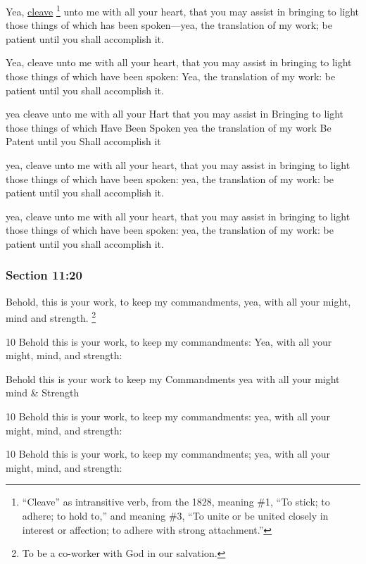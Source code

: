 		Yea, \hyperref[CLEAVE]{cleave}%
			\footnote{%
				``Cleave'' as intransitive verb, from the 1828, meaning \#1, ``To stick; to adhere; to hold to,'' and meaning \#3, ``To unite or be united closely in interest or affection; to adhere with strong attachment.''
				}
		unto me with all your heart, that you may assist in bringing to light those things of which has been spoken---yea, the translation of my work; be patient until you shall accomplish it.

		\begin{framed}
		\scriptsize
			\begin{compactdesc}
				\item[JSP] Yea, cleave unto me with all your heart, that you may assist in bringing to light those things of which have been spoken: Yea, the translation of my work: be patient until you shall accomplish it.
				\item[HS] yea cleave unto me with all your Hart that you may assist in Bringing to light those things of which Have Been Spoken yea the translation of my work Be Patent until you Shall accomplish it 
				\item[DC 1835] yea, cleave unto me with all your heart, that you may assist in bringing to light those things of which have been spoken: yea, the translation of my work: be patient until you shall accomplish it.
				\item[DC 1844] yea, cleave unto me with all your heart, that you may assist in bringing to light those things of which have been spoken: yea, the translation of my work: be patient until you shall accomplish it.
			\end{compactdesc}
		\end{framed}

	\subsubsection{Section 11:20} %
		\label{DC11-20}

		Behold, this is your work, to keep my commandments, yea, with all your might, mind and strength.%
			\footnote{%
				To be a co-worker with God in our salvation.
				}

		\begin{framed}
		\scriptsize
			\begin{compactdesc}
				\item[JSP] 10 Behold this is your work, to keep my commandments: Yea, with all your might, mind, and strength:
				\item[HS] Behold this is your work to keep my Commandments yea with all your might mind \& Strength 
				\item[DC 1835] 10 Behold this is your work, to keep my commandments: yea, with all your might, mind, and strength: 
				\item[DC 1844] 10 Behold this is your work, to keep my commandments; yea, with all your might, mind, and strength: 
			\end{compactdesc}
		\end{framed}

